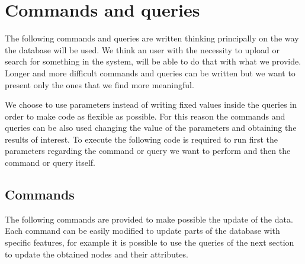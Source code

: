 

\chapter{Commands and queries}
\label{ch:commands_and_queries_neo4j}%
The following commands and queries are written thinking principally on the way the database will be used.
We think an user with the necessity to upload or search for something in the system, will be able to do that with what we provide.
Longer and more difficult commands and queries can be written but we want to present only the ones that we find more meaningful.

We choose to use parameters instead of writing fixed values inside the queries in order to make code as flexible as possible.
For this reason the commands and queries can be also used changing the value of the parameters and obtaining the results of interest.
To execute the following code is required to run first the parameters regarding the command or query we want to perform and then the command or query itself.


\section{Commands}
\label{sec:commands}%
The following commands are provided to make possible the update of the data.
Each command can be easily modified to update parts of the database with specific features, for example it is possible to use the queries of the next section to update the obtained nodes and their attributes.


